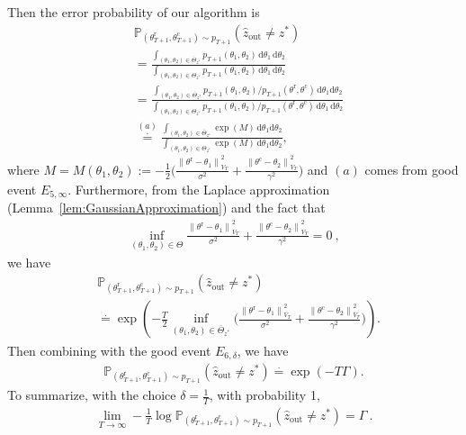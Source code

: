 \documentclass[accepted]{uai2025} %
\theoremstyle{plain}
\theoremstyle{definition}
\theoremstyle{remark}
\newcommand{\thetac}{\theta^{\mathrm{c}}}
\newcommand{\thetar}{\theta^{\mathrm{r}}}
\newcommand{\truethetac}{\theta^{\mathrm{c}}}
\newcommand{\truethetar}{\theta^{\mathrm{r}}}
\begin{document}
Then the error probability of our algorithm is
\begin{align*}  &\mathbb{P}_{(\thetar_{T+1},\thetac_{T+1})\sim p_{T+1}} (\hat{z}_\text{{out}} \neq z^*)
\\&=\frac{\int_{(\theta_1,\theta_2)\in \overline{\Theta}_{z^*}}p_{T+1}(\theta_1,\theta_2)\,\mathrm{d}\theta_1\,\mathrm{d}\theta_2}{\int_{(\theta_1,\theta_2)\in {\Theta}_{z^*}}p_{T+1}(\theta_1,\theta_2)\,\mathrm{d}\theta_1\,\mathrm{d}\theta_2}
\\&=\frac{\int_{(\theta_1,\theta_2)\in \overline{\Theta}_{z^*}}p_{T+1}(\theta_1,\theta_2)/p_{T+1}(\thetar,\thetac)\,\mathrm{d}\theta_1\mathrm{d}\theta_2}{\int_{(\theta_1,\theta_2)\in {\Theta}_{z^*}}p_{T+1}(\theta_1,\theta_2)/p_{T+1}(\thetar,\thetac)\,\mathrm{d}\theta_1\, \mathrm{d}\theta_2}
\\&\stackrel{(a)}{\stackrel{\cdot}{=}}\frac{\int_{(\theta_1,\theta_2)\in \overline{\Theta}_{z^*}} \exp \left( M\right)\,\mathrm{d}\theta_1\mathrm{d}\theta_2}{\int_{(\theta_1,\theta_2)\in {\Theta}_{z^*}}\exp \left( M\right)\,\mathrm{d}\theta_1\mathrm{d}\theta_2},
\end{align*}
where $M = M(\theta_1,\theta_2):=-\frac{1}{2} \Big( 
\frac{\left\| \truethetar - \theta_1 \right\|^2_{{V}_T}}{\sigma^2} 
+ \frac{\left\| \truethetac - \theta_2 \right\|^2_{{V}_T}}{\gamma^2} 
\Big) $ and $(a)$ comes from good event $E_{5,\infty}$.
Furthermore, from the Laplace approximation (Lemma~\ref{lem:GaussianApproximation}) and the fact that 
\begin{align*}
    \inf_{(\theta_1,\theta_2)\in {\Theta}}  
\frac{\left\| \truethetar - \theta_1 \right\|^2_{{V}_T}}{\sigma^2} 
+ \frac{\left\| \truethetac - \theta_2 \right\|^2_{{V}_T}}{\gamma^2} =0~,
\end{align*}
we have
\begin{align*}  &\mathbb{P}_{(\thetar_{T+1},\thetac_{T+1})\sim p_{T+1}} (\hat{z}_\text{{out}} \neq z^*)
\\&\stackrel{\cdot}{=}\exp \left( -\frac{T}{2} \inf_{(\theta_1,\theta_2)\in \overline{\Theta}_{z^*}}\bigg( 
\frac{\left\| \truethetar \!-\! \theta_1 \right\|^2_{\overline{V}_T}}{\sigma^2} 
\!+\! \frac{\left\| \truethetac \!-\! \theta_2 \right\|^2_{\overline{V}_T}}{\gamma^2} 
\bigg) \right).
\end{align*}
Then combining with the good event $E_{6,\delta}$, we have
\begin{align*}  \mathbb{P}_{(\thetar_{T+1},\thetac_{T+1})\sim p_{T+1}} (\hat{z}_\text{{out}} \neq z^*)\stackrel{\cdot}{=}
\exp \left( -T \Gamma \right).
\end{align*}
To summarize, with the choice $\delta=\frac{1}{T}$, with probability 1, 
\begin{align*}
        \lim_{T \to \infty} -\frac{1}{T} \log \mathbb{P}_{(\thetar_{T+1},\thetac_{T+1})\sim p_{T+1}} (\hat{z}_\text{{out}} \neq z^*) = \Gamma~.
    \end{align*}
\end{document}
